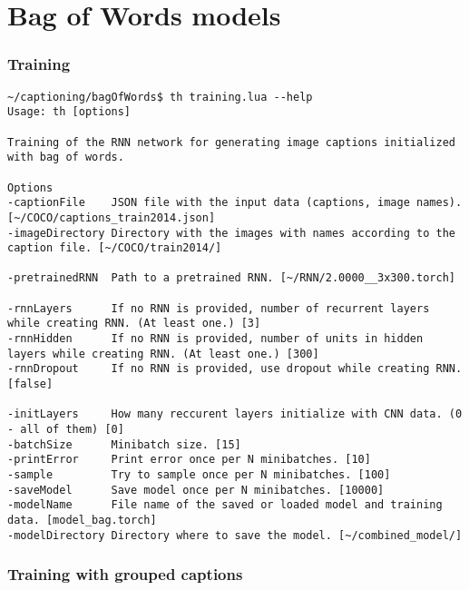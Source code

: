 \section{Bag of Words models}

\subsubsection{Training}

\begin{lstlisting}[firstnumber=1,breakindent=75pt]
~/captioning/bagOfWords$ th training.lua --help
Usage: th [options] 

Training of the RNN network for generating image captions initialized with bag of words.

Options
-captionFile    JSON file with the input data (captions, image names). [~/COCO/captions_train2014.json]
-imageDirectory Directory with the images with names according to the caption file. [~/COCO/train2014/]

-pretrainedRNN  Path to a pretrained RNN. [~/RNN/2.0000__3x300.torch]

-rnnLayers      If no RNN is provided, number of recurrent layers while creating RNN. (At least one.) [3]
-rnnHidden      If no RNN is provided, number of units in hidden layers while creating RNN. (At least one.) [300]
-rnnDropout     If no RNN is provided, use dropout while creating RNN. [false]

-initLayers     How many reccurent layers initialize with CNN data. (0 - all of them) [0]
-batchSize      Minibatch size. [15]
-printError     Print error once per N minibatches. [10]
-sample         Try to sample once per N minibatches. [100]
-saveModel      Save model once per N minibatches. [10000]
-modelName      File name of the saved or loaded model and training data. [model_bag.torch]
-modelDirectory Directory where to save the model. [~/combined_model/]
\end{lstlisting}
\hspace{1cm}

\subsubsection{Training with grouped captions}

